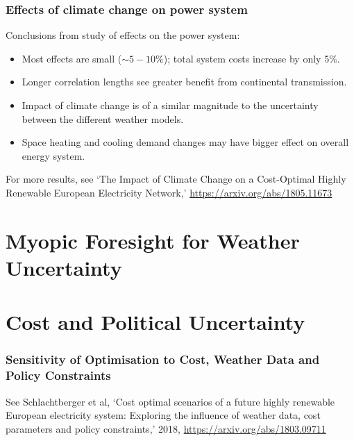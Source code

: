 \documentclass[10pt,aspectratio=169,dvipsnames]{beamer}
\let\olditem\item
\renewcommand{\item}{%
\olditem\vspace{5pt}}
\begin{document}
\begin{frame}
  \frametitle{Effects of climate change on power system}

  Conclusions from study of effects on the power system:

    \begin{itemize}
    \item Most effects are small ($\sim 5-10\%$); total system costs increase by only 5\%.
     \item Longer correlation lengths see greater benefit from continental transmission.
     \item Impact of climate change is of a similar magnitude to the uncertainty between the different weather models.
       \item Space heating and cooling demand changes may have bigger effect on overall energy system.
    \end{itemize}

    For more results, see `The Impact of Climate Change on a Cost-Optimal Highly Renewable European Electricity Network,' \url{https://arxiv.org/abs/1805.11673}

\end{frame}



\section{Myopic Foresight for Weather Uncertainty}


\section{Cost and Political Uncertainty}


\begin{frame}
  \frametitle{Sensitivity of Optimisation to Cost, Weather Data and Policy Constraints}

  See Schlachtberger et al, `Cost optimal scenarios of a future highly renewable European
  electricity system: Exploring the influence of weather data, cost
  parameters and policy constraints,' 2018,
  \url{https://arxiv.org/abs/1803.09711}

\end{frame}
\end{document}
